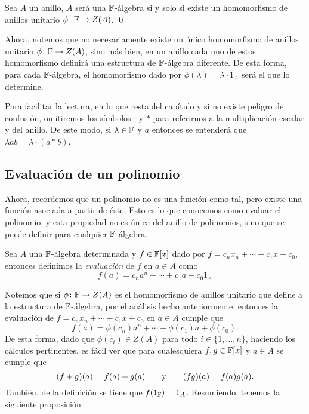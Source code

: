 \begin{teor}
  Sea $A$ un anillo, $A$ será una $\mathbb{F}$-álgebra si y solo si existe un homomorfismo de anillos unitario $\phi\colon \mathbb{F} \to Z(A)$. \qed
\end{teor}

Ahora, notemos que no necesariamente existe un único homomorfismo de anillos unitario $\phi\colon\mathbb{F}\to Z(A)$, sino más bien, en un anillo cada uno de estos homomorfismo definirá una estructura de $\mathbb{F}$-álgebra diferente. De esta forma, para cada $\mathbb{F}$-álgebra, el homomorfismo dado por $\phi(\lambda) = \lambda \cdot 1_A$ será el que lo determine.

Para facilitar la lectura, en lo que resta del capítulo y si no existe peligro de confusión, omitiremos los símbolos $\cdot$ y $*$ para referirnos a la multiplicación escalar y del anillo. De este modo, si $\lambda \in \mathbb{F}$ y $a$ entonces se entenderá que $\lambda a b = \lambda \cdot (a * b) $.



\subsection{Evaluación de un polinomio}

Ahora, recordemos que un polinomio no es una función como tal, pero existe una función asociada a partir de éste. Esto es lo que conocemos como evaluar el polinomio, y esta propiedad no es única del anillo de polinomios, sino que se puede definir para cualquier $\mathbb{F}$-álgebra.

\begin{defi}
  Sea $A$ una $\mathbb{F}$-álgebra determinada y $f \in \mathbb{F}[x]$ dado por $f = c_n x_n + \cdots+ c_1x + c_0$, entonces definimos la \emph{evaluación} de $f$ en $a \in A$ como
  \[
    f(a) = c_n a^n + \cdots + c_1 a + c_0 1_A
  \]
\end{defi}

Notemos que si $\phi\colon \mathbb{F}\to Z(A)$ es el homomorfismo de anillos unitario que define a la estructura de $\mathbb{F}$-álgebra, por el análisis hecho anteriormente, entonces la evaluación de $f = c_n x_n + \cdots+ c_1x + c_0$ en $a \in A$ cumple que
  \[
    f(a) = \phi(c_n) a^n + \cdots + \phi(c_1) a + \phi(c_0).
  \]
De esta forma, dado que $\phi(c_i) \in Z(A)$ para todo $i \in \{1,\ldots, n\}$, haciendo los cálculos pertinentes, es fácil ver que para cualesquiera $f, g \in \mathbb{F}[x]$ y $a \in A$ se cumple que
\[
  (f+g)(a) = f(a) + g(a)
    \qquad\text{y}\qquad
  (fg)(a) = f(a) g(a).
\]
También, de la definición se tiene que $f(1_{\mathbb{F}}) = 1_A$. Resumiendo, tenemos la siguiente proposición.

